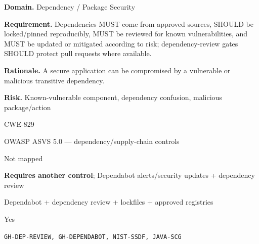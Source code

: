 \documentclass[10pt,letterpaper]{article}
\newcommand{\prioritybadge}[2]{\tcbox[on line,boxrule=0pt,arc=1.2mm,boxsep=0.7mm,left=1mm,right=1mm,top=0.4mm,bottom=0.4mm,colback=#2!12,coltext=#2]{\scriptsize\bfseries #1}}
\begin{document}
\begin{rulebox}[title={\texttt{SCS-ALL-DEP-001} \hfill \prioritybadge{Critical Control}{Critical}}]
\textbf{Domain.} Dependency / Package Security

\textbf{Requirement.} Dependencies MUST come from approved sources, SHOULD be locked/pinned reproducibly, MUST be reviewed for known vulnerabilities, and MUST be updated or mitigated according to risk; dependency-review gates SHOULD protect pull requests where available.

\textbf{Rationale.} A secure application can be compromised by a vulnerable or malicious transitive dependency.

\textbf{Risk.} Known-vulnerable component, dependency confusion, malicious package/action

\begin{description}[leftmargin=2.65cm,labelwidth=2.3cm,style=nextline,itemsep=1pt,topsep=3pt]
  \item[CWE] CWE-829
  \item[OWASP] OWASP ASVS 5.0 --- dependency/supply-chain controls
  \item[CERT] Not mapped
  \item[CodeQL] \textbf{Requires another control}; Dependabot alerts/security updates + dependency review
  \item[Enforcement] Dependabot + dependency review + lockfiles + approved registries
  \item[Automation] Yes
  \item[Sources] \texttt{GH-DEP-REVIEW, GH-DEPENDABOT, NIST-SSDF, JAVA-SCG}
\end{description}
\end{rulebox}
\end{document}
